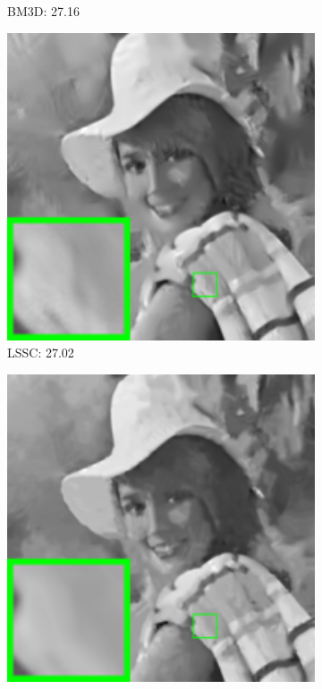 \begin{figure}
\begin{adjustwidth}{-2cm}{}
\begin{subfigure}[t]{0.19\textwidth}
		\caption{BM3D: 27.16}
    \end{subfigure}
    \hfill
    \begin{subfigure}[t]{0.19\textwidth}
        \centering
        \includegraphics[width=1\textwidth]{images/twsc/awgn/resize_br_LSSC_80_elaine.png}
		\caption{LSSC: 27.02}
    \end{subfigure}
    \hfill
    \begin{subfigure}[t]{0.19\textwidth}
        \centering
        \includegraphics[width=1\textwidth]{images/twsc/awgn/resize_br_NCSR_80_elaine.png}

\end{subfigure}
\end{adjustwidth}
\end{figure}
